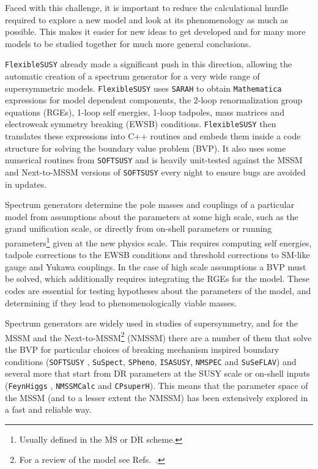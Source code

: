 \documentclass[final,3p,11pt,pdflatex]{elsarticle}
\makeatletter
\newcommand{\sarah}{\texttt{SARAH}\@\xspace}
\newcommand{\spheno}{\texttt{SPheno}\@\xspace}
\newcommand{\suspect}{\texttt{SuSpect}\@\xspace}
\newcommand{\isasusy}{\texttt{ISASUSY}\@\xspace}
\newcommand{\suseflav}{\texttt{SuSeFLAV}\@\xspace}
\newcommand{\nmspec}{\texttt{NMSPEC}\@\xspace}
\newcommand{\fs}{\texttt{FlexibleSUSY}\@\xspace}
\newcommand{\softsusy}{\texttt{SOFTSUSY}\@\xspace}
\newcommand{\FeynHiggs}{\texttt{FeynHiggs}\@\xspace}
\newcommand{\NMSSMCalc}{\texttt{NMSSMCalc}\@\xspace}
\newcommand{\CPsuperH}{\texttt{CPsuperH}\@\xspace}
\newcommand{\mathematica}{\texttt{Ma\-the\-ma\-ti\-ca}\xspace}
\newcommand{\ol}[1]{\overline{#1}}
\newcommand{\MSbar}{\ensuremath{\ol{\text{MS}}}\xspace}
\newcommand{\DRbar}{\ensuremath{\ol{\text{DR}}}\xspace}
\makeatother
\begin{document}
Faced with this challenge, it is important to reduce
the calculational hurdle required to explore a new model and
look at its phenomenology as much as possible. This makes it easier for
new ideas to get developed and for many more models to
be studied together for much more general conclusions.

\fs \cite{Athron:2014yba,Athron:2016fuq} already made a significant
push in this direction, allowing the automatic creation of a spectrum
generator for a very wide range of supersymmetric models.  \fs uses
\sarah \cite{Staub:2010ty,Staub:2009bi,Staub:2010jh,Staub:2012pb,
  Staub:2013tta} to obtain \mathematica expressions for model dependent
components, the 2-loop renormalization group equations (RGEs),
1-loop self energies, 1-loop tadpoles, mass matrices and
electroweak symmetry breaking (EWSB) conditions. \fs then translates these
expressions into C++ routines and embeds them inside a code structure
for solving the boundary value problem (BVP)\@.  It also uses some numerical
routines from \softsusy \cite{Allanach:2001kg,Allanach:2013kza} and is
heavily unit-tested against the MSSM and Next-to-MSSM versions of
\softsusy every night to ensure bugs are avoided in updates.


Spectrum generators determine the pole masses and couplings of a
particular model from assumptions about the parameters at some
high scale, such as the grand unification scale, or directly from
on-shell parameters or running parameters\footnote{Usually defined in
  the \MSbar or \DRbar scheme.} given at the new physics scale.
This requires computing self energies, tadpole corrections to the EWSB
conditions and threshold corrections to SM-like gauge and Yukawa
couplings.  In the case of high scale assumptions a BVP must be
solved, which additionally requires integrating the RGEs for the model.
These codes are essential for testing hypotheses about the parameters of
the model, and determining if they lead to phenomenologically viable masses.

Spectrum generators are widely used in studies of supersymmetry, and for the
MSSM and the Next-to-MSSM\footnote{For a review of the model see
  Refs.\ \cite{Ellwanger:2009dp, Maniatis:2009re}.} (NMSSM) there are
a number of them that solve the BVP for particular choices of breaking
mechanism inspired boundary conditions (\softsusy
\cite{Allanach:2001kg,Allanach:2009bv, Allanach:2011de,
  Allanach:2013kza, Allanach:2014nba,
  Allanach:2016rxd,Allanach:2017hcf}, \suspect \cite{Djouadi:2002ze},
\spheno \cite{Porod:2003um,Porod:2011nf}, \isasusy \cite{Baer:1993ae},
\nmspec \cite{Ellwanger:2004xm,Ellwanger:2005dv, Ellwanger:2006rn} and
\suseflav \cite{Chowdhury:2011zr}) and several more that start from \DRbar
parameters at the SUSY scale or on-shell inputs (\FeynHiggs
\cite{Heinemeyer:1998yj, Heinemeyer:1998np, Degrassi:2002fi,
  Frank:2006yh, Hahn:2013ria, Drechsel:2016jdg, Bahl:2016brp,
  Bahl:2017aev}, \NMSSMCalc \cite{Baglio:2013iia, King:2015oxa} and
\CPsuperH \cite{Lee:2003nta, Lee:2007gn, Lee:2012wa}). This means that
the parameter space of the MSSM (and to a lesser extent the NMSSM) has
been extensively explored in a fast and reliable way.
\end{document}
